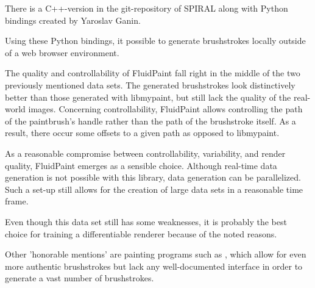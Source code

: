There is a C++-version in the git-repository of SPIRAL along with
Python bindings created by Yaroslav Ganin.

Using these Python bindings, it possible to generate brushstrokes locally outside of a web browser environment.

The quality and controllability of FluidPaint fall right in the middle of the two previously mentioned data sets.
The generated brushstrokes look distinctively better than those generated with libmypaint, but still lack the quality of the real-world images.
Concerning controllability, FluidPaint allows controlling the path of the paintbrush's handle rather than the path of the brushstroke itself.
As a result, there occur some offsets to a given path as opposed to libmypaint.

As a reasonable compromise between controllability, variability, and render quality, FluidPaint emerges as a sensible choice.
Although real-time data generation is not possible with this library, data generation can be parallelized.
Such a set-up still allows for the creation of large data sets in a reasonable time frame.

Even though this data set still has some weaknesses, it is probably the best choice for training a differentiable renderer because of the noted reasons.

Other 'honorable mentions' are painting programs such as , which allow for even more authentic brushstrokes but lack any well-documented interface in order to generate a vast number of brushstrokes.

